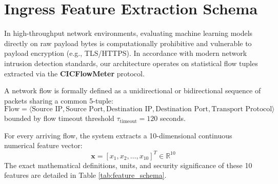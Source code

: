 \documentclass[12pt,a4paper,oneside]{report}
\begin{document}
\section{Ingress Feature Extraction Schema}
In high-throughput network environments, evaluating machine learning models directly on raw payload bytes is computationally prohibitive and vulnerable to payload encryption (e.g., TLS/HTTPS). In accordance with modern network intrusion detection standards, our architecture operates on statistical flow tuples extracted via the \textbf{CICFlowMeter} protocol.

A network flow is formally defined as a unidirectional or bidirectional sequence of packets sharing a common 5-tuple:
\begin{equation}
\text{Flow} = \langle \text{Source IP}, \text{Source Port}, \text{Destination IP}, \text{Destination Port}, \text{Transport Protocol} \rangle
\end{equation}
bounded by flow timeout threshold $\tau_{\text{timeout}} = 120$ seconds.

For every arriving flow, the system extracts a 10-dimensional continuous numerical feature vector:
\begin{equation}
\mathbf{x} = [x_1, x_2, \dots, x_{10}]^T \in \mathbb{R}^{10}
\end{equation}
The exact mathematical definitions, units, and security significance of these 10 features are detailed in Table \ref{tab:feature_schema}.
\end{document}
